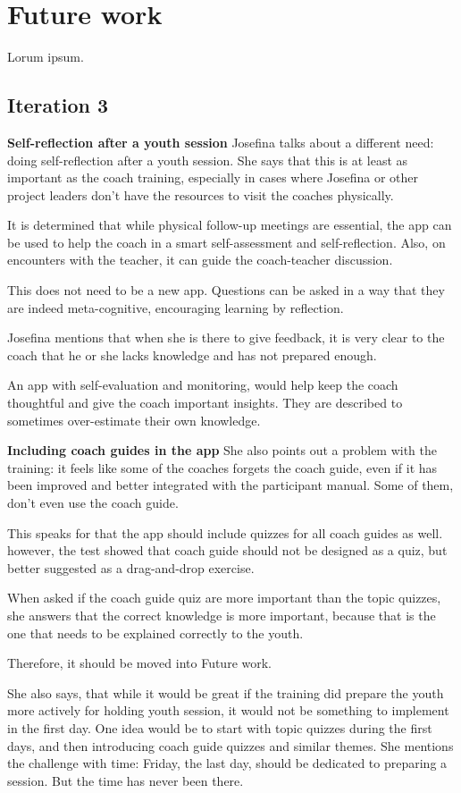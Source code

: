 \section{Future work}

Lorum ipsum.

\subsection{Iteration 3}

\textbf{Self-reflection after a youth session}
Josefina talks about a different need: doing self-reflection after a youth session. She says that this is at least as important as the coach training, especially in cases where Josefina or other project leaders don't have the resources to visit the coaches physically.

It is determined that while physical follow-up meetings are essential, the app can be used to help the coach in a smart self-assessment and self-reflection. Also, on encounters with the teacher, it can guide the coach-teacher discussion.

This does not need to be a new app. Questions can be asked in a way that they are indeed meta-cognitive, encouraging learning by reflection.

Josefina mentions that when she is there to give feedback, it is very clear to the coach that he or she lacks knowledge and has not prepared enough.

An app with self-evaluation and monitoring, would help keep the coach thoughtful and give the coach important insights. They are described to sometimes over-estimate their own knowledge.

\textbf{Including coach guides in the app}
She also points out a problem with the training: it feels like some of the coaches forgets the coach guide, even if it has been improved and better integrated with the participant manual. Some of them, don't even use the coach guide.

This speaks for that the app should include quizzes for all coach guides as well. however, the test showed that coach guide should not be designed as a quiz, but better suggested as a drag-and-drop exercise.

When asked if the coach guide quiz are more important than the topic quizzes, she answers that the correct knowledge is more important, because that is the one that needs to be explained correctly to the youth.

Therefore, it should be moved into Future work.

She also says, that while it would be great if the training did prepare the youth more actively for holding youth session, it would not be something to implement in the first day. One idea would be to start with topic quizzes during the first days, and then introducing coach guide quizzes and similar themes. She mentions the challenge with time: Friday, the last day, should be dedicated to preparing a session. But the time has never been there.
